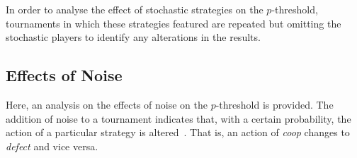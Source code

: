 In order to analyse the effect of stochastic strategies on the \(p\)-threshold,
tournaments in which these strategies featured are repeated but omitting the
stochastic players to identify any alterations in the results. 




\subsection{Effects of Noise}\label{subsec:Effects_of_Noise}

Here, an analysis on the effects of noise on the \(p\)-threshold is provided.
The addition of noise to a tournament indicates that, with a certain
probability, the action of a particular strategy is
altered~\cite{glynatsi2020meta}. That is, an action of \textit{coop} changes to
\textit{defect} and vice versa.  

